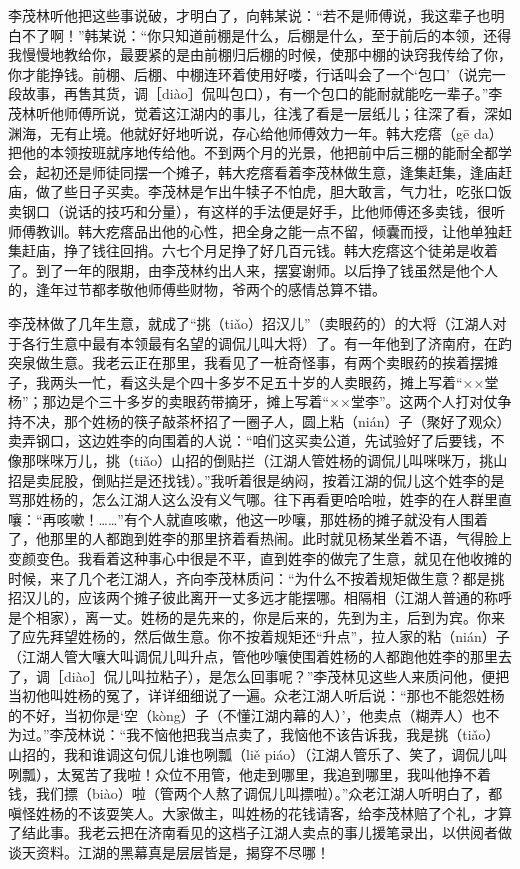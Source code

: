 \documentclass[12pt,UTF8]{ctexbook}
\begin{document}
李茂林听他把这些事说破，才明白了，向韩某说：“若不是师傅说，我这辈子也明白不了啊！”韩某说：“你只知道前棚是什么，后棚是什么，至于前后的本领，还得我慢慢地教给你，最要紧的是由前棚归后棚的时候，使那中棚的诀窍我传给了你，你才能挣钱。前棚、后棚、中棚连环着使用好喽，行话叫会了一个‘包口’（说完一段故事，再售其货，调［diào］侃叫包口），有一个包口的能耐就能吃一辈子。”李茂林听他师傅所说，觉着这江湖内的事儿，往浅了看是一层纸儿；往深了看，深如渊海，无有止境。他就好好地听说，存心给他师傅效力一年。韩大疙瘩（gē da）把他的本领按班就序地传给他。不到两个月的光景，他把前中后三棚的能耐全都学会，起初还是师徒同摆一个摊子，韩大疙瘩看着李茂林做生意，逢集赶集，逢庙赶庙，做了些日子买卖。李茂林是乍出牛犊子不怕虎，胆大敢言，气力壮，吃张口饭卖钢口（说话的技巧和分量），有这样的手法便是好手，比他师傅还多卖钱，很听师傅教训。韩大疙瘩品出他的心性，把全身之能一点不留，倾囊而授，让他单独赶集赶庙，挣了钱往回捎。六七个月足挣了好几百元钱。韩大疙瘩这个徒弟是收着了。到了一年的限期，由李茂林约出人来，摆宴谢师。以后挣了钱虽然是他个人的，逢年过节都孝敬他师傅些财物，爷两个的感情总算不错。

李茂林做了几年生意，就成了“挑（tiǎo）招汉儿”（卖眼药的）的大将（江湖人对于各行生意中最有本领最有名望的调侃儿叫大将）了。有一年他到了济南府，在趵突泉做生意。我老云正在那里，我看见了一桩奇怪事，有两个卖眼药的挨着摆摊子，我两头一忙，看这头是个四十多岁不足五十岁的人卖眼药，摊上写着“××堂杨”；那边是个三十多岁的卖眼药带摘牙，摊上写着“××堂李”。这两个人打对仗争持不决，那个姓杨的筷子敲茶杯招了一圈子人，圆上粘（nián）子（聚好了观众）卖弄钢口，这边姓李的向围着的人说：“咱们这买卖公道，先试验好了后要钱，不像那咪咪万儿，挑（tiǎo）山招的倒贴拦（江湖人管姓杨的调侃儿叫咪咪万，挑山招是卖屁股，倒贴拦是还找钱）。”我听着很是纳闷，按着江湖的侃儿这个姓李的是骂那姓杨的，怎么江湖人这么没有义气哪。往下再看更哈哈啦，姓李的在人群里直嚷：“再咳嗽！……”有个人就直咳嗽，他这一吵嚷，那姓杨的摊子就没有人围着了，他那里的人都跑到姓李的那里挤着看热闹。此时就见杨某坐着不语，气得脸上变颜变色。我看着这种事心中很是不平，直到姓李的做完了生意，就见在他收摊的时候，来了几个老江湖人，齐向李茂林质问：“为什么不按着规矩做生意？都是挑招汉儿的，应该两个摊子彼此离开一丈多远才能摆哪。相隔相（江湖人普通的称呼是个相家），离一丈。姓杨的是先来的，你是后来的，先到为主，后到为宾。你来了应先拜望姓杨的，然后做生意。你不按着规矩还“升点”，拉人家的粘（nián）子（江湖人管大嚷大叫调侃儿叫升点，管他吵嚷使围着姓杨的人都跑他姓李的那里去了，调［diào］侃儿叫拉粘子），是怎么回事呢？”李茂林见这些人来质问他，便把当初他叫姓杨的冤了，详详细细说了一遍。众老江湖人听后说：“那也不能怨姓杨的不好，当初你是‘空（kòng）子（不懂江湖内幕的人）’，他卖点（糊弄人）也不为过。”李茂林说：“我不恼他把我当点卖了，我恼他不该告诉我，我是挑（tiǎo）山招的，我和谁调这句侃儿谁也咧瓢（liě piáo）（江湖人管乐了、笑了，调侃儿叫咧瓢），太冤苦了我啦！众位不用管，他走到哪里，我追到哪里，我叫他挣不着钱，我们摽（biào）啦（管两个人熬了调侃儿叫摽啦）。”众老江湖人听明白了，都嗔怪姓杨的不该耍笑人。大家做主，叫姓杨的花钱请客，给李茂林赔了个礼，才算了结此事。我老云把在济南看见的这档子江湖人卖点的事儿援笔录出，以供阅者做谈天资料。江湖的黑幕真是层层皆是，揭穿不尽哪！
\end{document}
